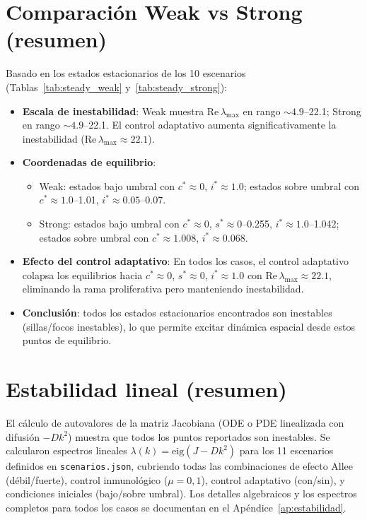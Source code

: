 \section{Comparación Weak vs Strong (resumen)}
Basado en los estados estacionarios de los 10 escenarios (Tablas~\ref{tab:steady_weak} y~\ref{tab:steady_strong}):
\begin{itemize}
  \item \textbf{Escala de inestabilidad}: Weak muestra Re\,$\lambda_{\max}$ en rango $\sim 4.9$–22.1; Strong en rango $\sim 4.9$–22.1. El control adaptativo aumenta significativamente la inestabilidad (Re\,$\lambda_{\max}\approx 22.1$).
  \item \textbf{Coordenadas de equilibrio}: 
    \begin{itemize}
      \item Weak: estados bajo umbral con $c^*\approx 0$, $i^*\approx 1.0$; estados sobre umbral con $c^*\approx 1.0$–1.01, $i^*\approx 0.05$–0.07.
      \item Strong: estados bajo umbral con $c^*\approx 0$, $s^*\approx 0$–0.255, $i^*\approx 1.0$–1.042; estados sobre umbral con $c^*\approx 1.008$, $i^*\approx 0.068$.
    \end{itemize}
  \item \textbf{Efecto del control adaptativo}: En todos los casos, el control adaptativo colapsa los equilibrios hacia $c^*\approx 0$, $s^*\approx 0$, $i^*\approx 1.0$ con Re\,$\lambda_{\max}\approx 22.1$, eliminando la rama proliferativa pero manteniendo inestabilidad.
  \item \textbf{Conclusión}: todos los estados estacionarios encontrados son inestables (sillas/focos inestables), lo que permite excitar dinámica espacial desde estos puntos de equilibrio.
\end{itemize}

\section{Estabilidad lineal (resumen)}
El cálculo de autovalores de la matriz Jacobiana (ODE o PDE linealizada con difusión $-Dk^2$) muestra que todos los puntos reportados son inestables. Se calcularon espectros lineales $\lambda(k)=\mathrm{eig}(J-Dk^2)$ para los 11 escenarios definidos en \texttt{scenarios.json}, cubriendo todas las combinaciones de efecto Allee (débil/fuerte), control inmunológico ($\mu=0,1$), control adaptativo (con/sin), y condiciones iniciales (bajo/sobre umbral). Los detalles algebraicos y los espectros completos para todos los casos se documentan en el Apéndice~\ref{ap:estabilidad}.



















